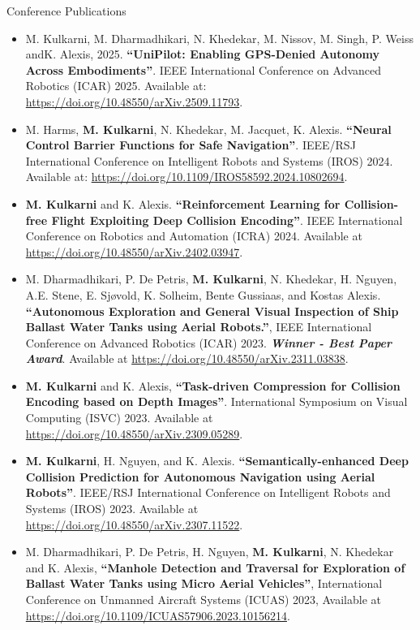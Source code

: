 \documentclass{resume} %
\begin{document}
\newpage
\begin{rSection}{Conference Publications}
\begin{itemize}
    \item M. Kulkarni, M. Dharmadhikari, N. Khedekar, M. Nissov, M. Singh, P. Weiss andK. Alexis, 2025. \textbf{``UniPilot: Enabling GPS-Denied Autonomy Across Embodiments''}. IEEE International Conference on Advanced Robotics (ICAR) 2025. Available at: \url{https://doi.org/10.48550/arXiv.2509.11793}.
    \item M. Harms, \textbf{M. Kulkarni}, N. Khedekar, M. Jacquet, K. Alexis. \textbf{``Neural Control Barrier Functions for Safe Navigation''}. IEEE/RSJ International Conference on Intelligent Robots and Systems (IROS) 2024. Available at: \url{https://doi.org/10.1109/IROS58592.2024.10802694}.
    \item \textbf{M. Kulkarni} and K. Alexis. \textbf{``Reinforcement Learning for Collision-free Flight Exploiting Deep Collision Encoding''}. IEEE International Conference on Robotics and Automation (ICRA) 2024. Available at \url{https://doi.org/10.48550/arXiv.2402.03947}.
    \item M. Dharmadhikari, P. De Petris, \textbf{M. Kulkarni}, N. Khedekar, H. Nguyen, A.E. Stene, E. Sjøvold, K. Solheim, Bente Gussiaas, and Kostas Alexis. \textbf{``Autonomous Exploration and General Visual Inspection of Ship Ballast Water Tanks using Aerial Robots.''}, IEEE International Conference on Advanced Robotics (ICAR) 2023. \textit{\textbf{Winner - Best Paper Award}}. Available at \url{https://doi.org/10.48550/arXiv.2311.03838}.
    \item \textbf{M. Kulkarni} and K. Alexis, \textbf{``Task-driven Compression for Collision Encoding based on Depth Images''}. International Symposium on Visual Computing (ISVC) 2023. Available at \url{https://doi.org/10.48550/arXiv.2309.05289}.
    \item \textbf{M. Kulkarni}, H. Nguyen, and K. Alexis. \textbf{``Semantically-enhanced Deep Collision Prediction for Autonomous Navigation using Aerial Robots''}. IEEE/RSJ International Conference on Intelligent Robots and Systems (IROS) 2023. Available at \url{https://doi.org/10.48550/arXiv.2307.11522}.
    \item M. Dharmadhikari, P. De Petris, H. Nguyen, \textbf{M. Kulkarni}, N. Khedekar and K. Alexis, \textbf{``Manhole Detection and Traversal for Exploration of Ballast Water Tanks using Micro Aerial Vehicles''}, International Conference on Unmanned Aircraft Systems (ICUAS) 2023, Available at \url{https://doi.org/10.1109/ICUAS57906.2023.10156214}.

\end{itemize}
\end{rSection}
\end{document}
